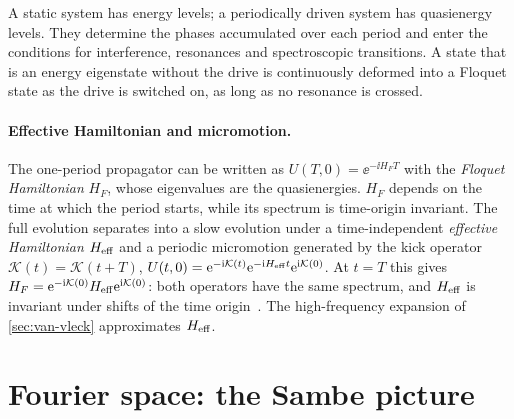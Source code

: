 \begin{physics}
A static system has energy levels; a periodically driven system has quasienergy levels.
They determine the phases accumulated over each period and enter the conditions for
interference, resonances and spectroscopic transitions. A state that is
an energy eigenstate without the drive is continuously deformed into a Floquet state as the
drive is switched on, as long as no resonance is crossed.
\end{physics}

\paragraph{Effective Hamiltonian and micromotion.}
The one-period propagator can be written as $U(T,0)=\ee^{-\ii H_FT}$ with the
\emph{Floquet Hamiltonian} $H_F$, whose eigenvalues are the quasienergies. $H_F$ depends on
the time at which the period starts, while its spectrum is time-origin invariant. The full evolution
separates into a slow evolution under a time-independent \emph{effective Hamiltonian}
$H_{\mathrm{eff}}$ and a periodic micromotion generated by the kick operator
$\mathcal K(t)=\mathcal K(t+T)$,
$U(t,0)=\mathrm{e}^{-\mathrm{i}\mathcal K(t)}\mathrm{e}^{-\mathrm{i}H_{\mathrm{eff}} t}\mathrm{e}^{\mathrm{i}\mathcal K(0)}$. At $t=T$ this gives
$H_F=\mathrm{e}^{-\mathrm{i}\mathcal K(0)}H_{\mathrm{eff}}\mathrm{e}^{\mathrm{i}\mathcal K(0)}$: both operators have the same
spectrum, and $H_{\mathrm{eff}}$ is invariant under shifts of the time
origin~\cite{goldman2014periodically,bukov2015universal,eckardt2015high}. The
high-frequency expansion of \cref{sec:van-vleck} approximates $H_{\mathrm{eff}}$.

\section{Fourier space: the Sambe picture}\label{sec:sambe}

